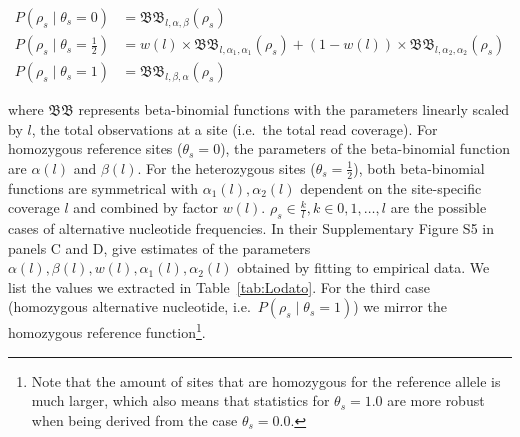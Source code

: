 \documentclass[authoryear,preprint,11pt]{scrartcl}
\newcommand{\Prob}{{P}}
\newcommand{\cB}{{\mathfrak B}}
\begin{document}
\begin{equation}
 \begin{split}
  \Prob(\rho_s \mid \theta_s = 0 ) 			&= \cB\cB_{l,\alpha, \beta}(\rho_s)\\
  \Prob(\rho_s \mid \theta_s = \frac12) &= w(l) \times \cB\cB_{l,\alpha_1,\alpha_1}(\rho_s) + (1-w(l)) \times \cB\cB_{l,\alpha_2,\alpha_2}(\rho_s)\\
  \Prob(\rho_s \mid \theta_s = 1 ) 			&= \cB\cB_{l,\beta,\alpha}(\rho_s)
 \end{split}
\end{equation}

where $\cB\cB$ represents beta-binomial functions with the parameters linearly scaled by $l$, the total observations at a site (i.e.~the total read coverage).
For homozygous reference sites ($\theta_s = 0$), the parameters of the beta-binomial function are $\alpha(l)$ and $\beta(l)$.
For the heterozygous sites ($\theta_s = \frac12$), both beta-binomial functions are symmetrical with $\alpha_1(l),\alpha_2(l)$ dependent on the site-specific coverage $l$ and combined by factor $w(l)$.
$\rho_s \in \frac{k}{l}, k \in {0, 1, \dots, l}$ are the possible cases of alternative nucleotide frequencies.
In their Supplementary Figure S5 in panels C and D, \cite{lodato_somatic_2015} give estimates of the parameters $\alpha(l), \beta(l), w(l), \alpha_1(l), \alpha_2(l)$ obtained by fitting to empirical data.
We list the values we extracted in Table~\ref{tab:Lodato}.
For the third case (homozygous alternative nucleotide, i.e.~$\Prob(\rho_s \mid \theta_s = 1)$) we mirror the homozygous reference function\footnote{
Note that the amount of sites that are homozygous for the reference allele is much larger, which also means that statistics for $\theta_s=1.0$ are more robust when being derived from the case $\theta_s=0.0$.
}.
\end{document}
